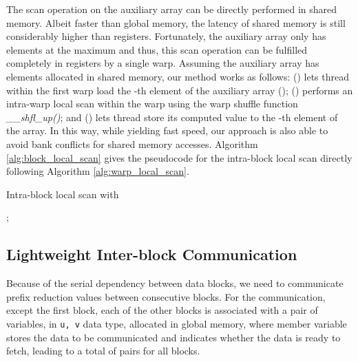 \documentclass[article]{elsarticle}
\begin{document}
{The scan operation on the auxiliary array can be directly performed in shared memory. Albeit faster than global memory, the latency of shared memory is still considerably higher than registers. Fortunately, the auxiliary array only has  elements at the maximum and thus, this scan operation can be fulfilled completely in registers by a single warp. Assuming the auxiliary array has  elements allocated in shared memory, our method works as follows: () lets thread  within the first warp load the -th element of the auxiliary array (\mbox{}); () performs an intra-warp local scan within the warp using the warp shuffle function \textit{\_\_shfl\_up()}; and () lets thread  store its computed value to the -th element of the array. In this way, while yielding fast speed, our approach is also able to avoid bank conflicts for shared memory accesses. Algorithm \ref{alg:block_local_scan} gives the pseudocode for the intra-block local scan directly following Algorithm \ref{alg:warp_local_scan}.
\begin{algorithm}[!h]
\caption{Intra-block local scan with \mbox{}}
\label{alg:block_local_scan}
\begin{algorithmic}[1]
\fontsize{8pt}{8.05pt}\selectfont
{}

	\State { = ;}
    
    	\State{[] = ;}
    \EndIf
    
    	\State { = [];}
        	\If {}
        		;
	        \EndIf
    	\EndFor
        \State{[] = ;}
    \EndIf
    
    \State { =   ;}
    \State { =   ;}
    \State { =   ;}
   	\State { =   ;}
\EndProcedure
\end{algorithmic}
\end{algorithm}
\subsection{Lightweight Inter-block Communication}
Because of the serial dependency between data blocks, we need to communicate prefix reduction values between consecutive blocks. For the communication, except the first block, each of the other blocks is associated with a pair of variables, in \hbox{{\tt u, v}} data type, allocated in global memory, where member variable  stores the data to be communicated and  indicates whether the data is ready to fetch, leading to a total of  pairs for all blocks.

}
\end{document}
